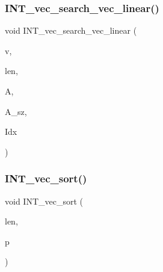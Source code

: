 \subsubsection{\texorpdfstring{I\+N\+T\+\_\+vec\+\_\+search\+\_\+vec\+\_\+linear()}{INT\_vec\_search\_vec\_linear()}}
{\footnotesize\ttfamily void I\+N\+T\+\_\+vec\+\_\+search\+\_\+vec\+\_\+linear (\begin{DoxyParamCaption}\item[{\mbox{\hyperlink{galois_8h_a09fddde158a3a20bd2dcadb609de11dc}{I\+NT}} $\ast$}]{v,  }\item[{\mbox{\hyperlink{galois_8h_a09fddde158a3a20bd2dcadb609de11dc}{I\+NT}}}]{len,  }\item[{\mbox{\hyperlink{galois_8h_a09fddde158a3a20bd2dcadb609de11dc}{I\+NT}} $\ast$}]{A,  }\item[{\mbox{\hyperlink{galois_8h_a09fddde158a3a20bd2dcadb609de11dc}{I\+NT}}}]{A\+\_\+sz,  }\item[{\mbox{\hyperlink{galois_8h_a09fddde158a3a20bd2dcadb609de11dc}{I\+NT}} $\ast$}]{Idx }\end{DoxyParamCaption})}

\mbox{\label{sorting_8_c_a877cf6c0867f8a8e7c199476e640eca5}} 
\subsubsection{\texorpdfstring{I\+N\+T\+\_\+vec\+\_\+sort()}{INT\_vec\_sort()}}
{\footnotesize\ttfamily void I\+N\+T\+\_\+vec\+\_\+sort (\begin{DoxyParamCaption}\item[{\mbox{\hyperlink{galois_8h_a09fddde158a3a20bd2dcadb609de11dc}{I\+NT}}}]{len,  }\item[{\mbox{\hyperlink{galois_8h_a09fddde158a3a20bd2dcadb609de11dc}{I\+NT}} $\ast$}]{p }\end{DoxyParamCaption})}

\mbox{\label{sorting_8_c_a160a164cfbea821ced70043337e22d18}} 
